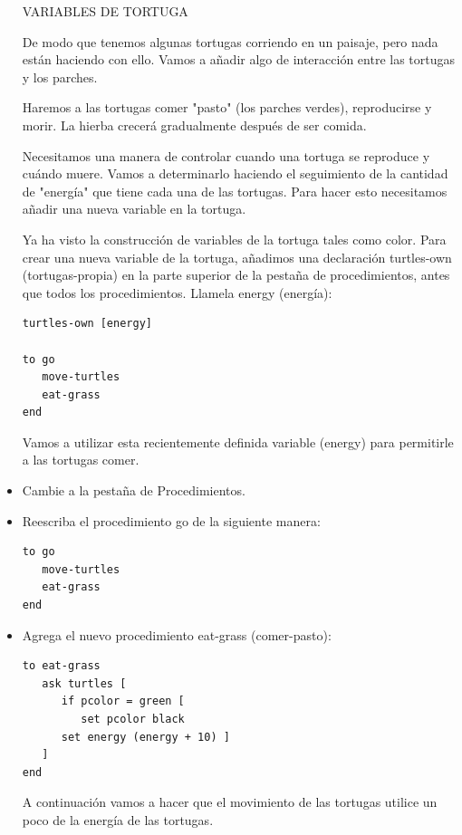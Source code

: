 \documentclass[12pt,letterpaper]{article}
\begin{document}
\begin{itemize}
\begin{center}
VARIABLES DE TORTUGA	
\end{center}

De modo que tenemos algunas tortugas corriendo en un paisaje, pero nada están haciendo con ello. Vamos a añadir algo de interacción entre las tortugas y los parches.

Haremos a las tortugas comer "pasto" (los parches verdes), reproducirse y morir. La hierba crecerá gradualmente después de ser comida.

Necesitamos una manera de controlar cuando una tortuga se reproduce y cuándo muere. Vamos a determinarlo haciendo el seguimiento de la cantidad de "energía" que tiene cada una de las tortugas. Para hacer esto necesitamos añadir una nueva variable en la tortuga.

Ya ha visto la construcción de variables de la tortuga tales como color. Para crear una nueva variable de la tortuga, añadimos una declaración turtles-own   (tortugas-propia) en la parte superior de la pestaña de procedimientos, antes que todos los procedimientos. Llamela energy (energía):

\begin{lstlisting}
turtles-own [energy] 

to go
   move-turtles
   eat-grass
end

\end{lstlisting}

Vamos a utilizar esta recientemente definida variable (energy) para permitirle a las tortugas comer.

\item Cambie a la pestaña de Procedimientos.
\item Reescriba el procedimiento go de la siguiente manera:

\begin{lstlisting}
to go
   move-turtles
   eat-grass
end
\end{lstlisting}

\item Agrega el nuevo procedimiento eat-grass (comer-pasto):

\begin{lstlisting}
to eat-grass
   ask turtles [
      if pcolor = green [
         set pcolor black
      set energy (energy + 10) ] 
   ] 
end
\end{lstlisting}


A continuación vamos a hacer que el movimiento de las tortugas utilice un poco de la energía de las tortugas.


\end{itemize}
\end{document}
